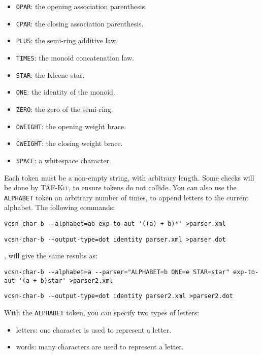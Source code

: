 \documentclass[a4paper]{report}
\newcommand{\tafkit}{\textsc{TAF-Kit}\xspace}
\begin{document}
\begin{itemize}
\item \verb-OPAR-: the opening association parenthesis.
\item \verb-CPAR-: the closing association parenthesis.
\item \verb-PLUS-: the semi-ring additive law.
\item \verb-TIMES-: the monoid concatenation law.
\item \verb-STAR-: the Kleene star.
\item \verb-ONE-: the identity of the monoid.
\item \verb-ZERO-: the zero of the semi-ring.
\item \verb-OWEIGHT-: the opening weight brace.
\item \verb-CWEIGHT-: the closing weight brace.
\item \verb-SPACE-: a whitespace character.
\end{itemize}

\noindent
Each token must be a non-empty string, with arbitrary length. Some checks
will be done by \tafkit, to ensure tokens do not collide. You can also
use the \verb-ALPHABET- token an arbitrary number of times, to append letters
to the current alphabet. The following commands:

\begin{verbatim}
vcsn-char-b --alphabet=ab exp-to-aut '((a) + b)*' >parser.xml
\end{verbatim}
\begin{verbatim}
vcsn-char-b --output-type=dot identity parser.xml >parser.dot
\end{verbatim}

\noindent
, will give the same results as:
\begin{verbatim}
vcsn-char-b --alphabet=a --parser="ALPHABET=b ONE=e STAR=star" exp-to-aut '(a + b)star' >parser2.xml
\end{verbatim}
\begin{verbatim}
vcsn-char-b --output-type=dot identity parser2.xml >parser2.dot
\end{verbatim}

\noindent
With the \verb-ALPHABET- token, you can specify two types of letters:

\begin{itemize}
\item letters: one character is used to represent a letter.
\item words: many characters are used to represent a letter.
\end{itemize}
\end{document}
